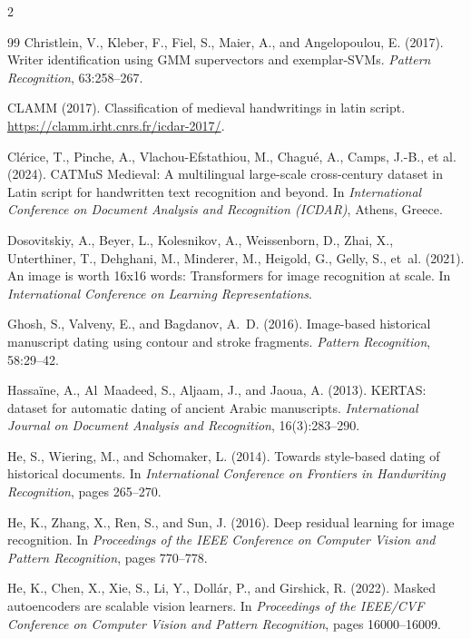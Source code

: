 \documentclass[12pt,a4paper]{article}
\begin{document}
\begin{multicols}{2}
\begin{thebibliography}{99}
Christlein, V., Kleber, F., Fiel, S., Maier, A., and Angelopoulou, E. (2017).
\newblock Writer identification using GMM supervectors and exemplar-SVMs.
\newblock \textit{Pattern Recognition}, 63:258--267.

CLAMM (2017).
\newblock Classification of medieval handwritings in latin script.
\newblock \url{https://clamm.irht.cnrs.fr/icdar-2017/}.

Cl{\'e}rice, T., Pinche, A., Vlachou-Efstathiou, M., Chagu{\'e}, A., Camps, J.-B., et al. (2024).
\newblock CATMuS Medieval: A multilingual large-scale cross-century dataset in Latin script for handwritten text recognition and beyond.
\newblock In \textit{International Conference on Document Analysis and Recognition (ICDAR)}, Athens, Greece.

Dosovitskiy, A., Beyer, L., Kolesnikov, A., Weissenborn, D., Zhai, X., Unterthiner, T., Dehghani, M., Minderer, M., Heigold, G., Gelly, S., et~al. (2021).
\newblock An image is worth 16x16 words: Transformers for image recognition at scale.
\newblock In \textit{International Conference on Learning Representations}.

Ghosh, S., Valveny, E., and Bagdanov, A.~D. (2016).
\newblock Image-based historical manuscript dating using contour and stroke fragments.
\newblock \textit{Pattern Recognition}, 58:29--42.

Hassaïne, A., Al~Maadeed, S., Aljaam, J., and Jaoua, A. (2013).
\newblock KERTAS: dataset for automatic dating of ancient Arabic manuscripts.
\newblock \textit{International Journal on Document Analysis and Recognition}, 16(3):283--290.

He, S., Wiering, M., and Schomaker, L. (2014).
\newblock Towards style-based dating of historical documents.
\newblock In \textit{International Conference on Frontiers in Handwriting Recognition}, pages 265--270.

He, K., Zhang, X., Ren, S., and Sun, J. (2016).
\newblock Deep residual learning for image recognition.
\newblock In \textit{Proceedings of the IEEE Conference on Computer Vision and Pattern Recognition}, pages 770--778.

He, K., Chen, X., Xie, S., Li, Y., Dollár, P., and Girshick, R. (2022).
\newblock Masked autoencoders are scalable vision learners.
\newblock In \textit{Proceedings of the IEEE/CVF Conference on Computer Vision and Pattern Recognition}, pages 16000--16009.


\end{thebibliography}
\end{multicols}
\end{document}
